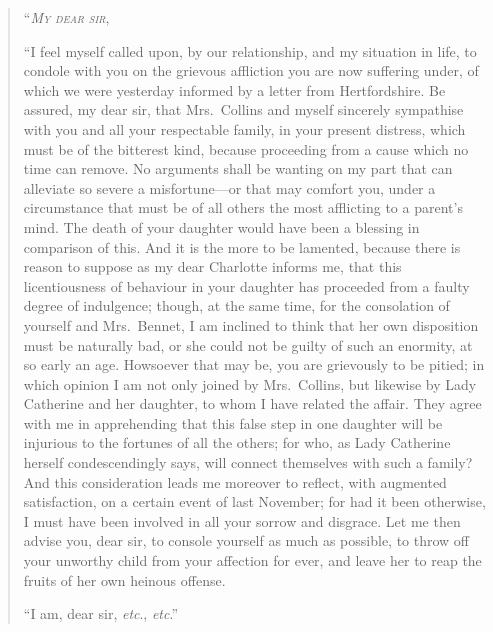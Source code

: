 \documentclass[12pt,english]{book}
\newcommand{\noun}[1]{\textsc{#1}}
\begin{document}
\noindent \begin{quotation}\noindent{}{}``\textit{\emph{\noun{My}}}
\textit{\emph{\noun{dear}}} \textit{\emph{\noun{sir}}},

{}``I feel myself called upon, by our relationship, and my situation
in life, to condole with you on the grievous affliction you are now
suffering under, of which we were yesterday informed by a letter from
Hertfordshire. Be assured, my dear sir, that Mrs.\ Collins and myself
sincerely sympathise with you and all your respectable family, in
your present distress, which must be of the bitterest kind, because
proceeding from a cause which no time can remove. No arguments shall
be wanting on my part that can alleviate so severe a misfortune\mbox{---}or
that may comfort you, under a circumstance that must be of all others
the most afflicting to a parent's mind. The death of your daughter
would have been a blessing in comparison of this. And it is the more
to be lamented, because there is reason to suppose as my dear Charlotte
informs me, that this licentiousness of behaviour in your daughter
has proceeded from a faulty degree of indulgence; though, at the same
time, for the consolation of yourself and Mrs.\ Bennet, I am inclined
to think that her own disposition must be naturally bad, or she could
not be guilty of such an enormity, at so early an age. Howsoever that
may be, you are grievously to be pitied; in which opinion I am not
only joined by Mrs.\ Collins, but likewise by Lady Catherine and
her daughter, to whom I have related the affair. They agree with me
in apprehending that this false step in one daughter will be injurious
to the fortunes of all the others; for who, as Lady Catherine herself
condescendingly says, will connect themselves with such a family?
And this consideration leads me moreover to reflect, with augmented
satisfaction, on a certain event of last November; for had it been
otherwise, I must have been involved in all your sorrow and disgrace.
Let me then advise you, dear sir, to console yourself as much as possible,
to throw off your unworthy child from your affection for ever, and
leave her to reap the fruits of her own heinous offense.

``I am, dear sir, \textit{etc}., \textit{etc}.''
\end{quotation}
\end{document}
